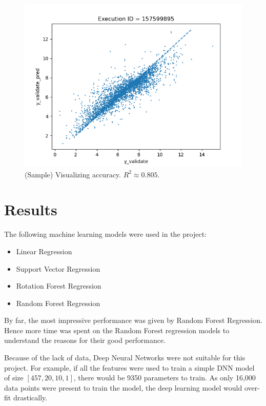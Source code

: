 \documentclass[11pt]{article}
\begin{document}
\begin{figure}[htb]
  \centering
    \includegraphics[width=1.0\textwidth]{images/accuracy_validate}
    \caption{(Sample) Visualizing accuracy.  $R^2 \approx 0.805$.}
    \label{fig:modelQualityVisualization}
\end{figure}


\section{Results}
\label{MachineLearningModelslabel}
The following machine learning models were used in the project:
\begin{itemize}
\item Linear Regression
\item Support Vector Regression
\item Rotation Forest Regression
\item Random Forest Regression
\end{itemize}

By far, the most impressive performance was given by Random Forest Regression.
Hence more time was spent on the Random Forest regression models to understand the reasons for their good performance.

Because of the lack of data, Deep Neural Networks were not suitable for this project. 
For example, if all the features were used to train a simple DNN model of size $[457,  20, 10,  1]$,  there would be 9350 parameters to train.  As only 16,000 data points were present to train the model,  the deep learning model would over-fit drastically.
\end{document}
